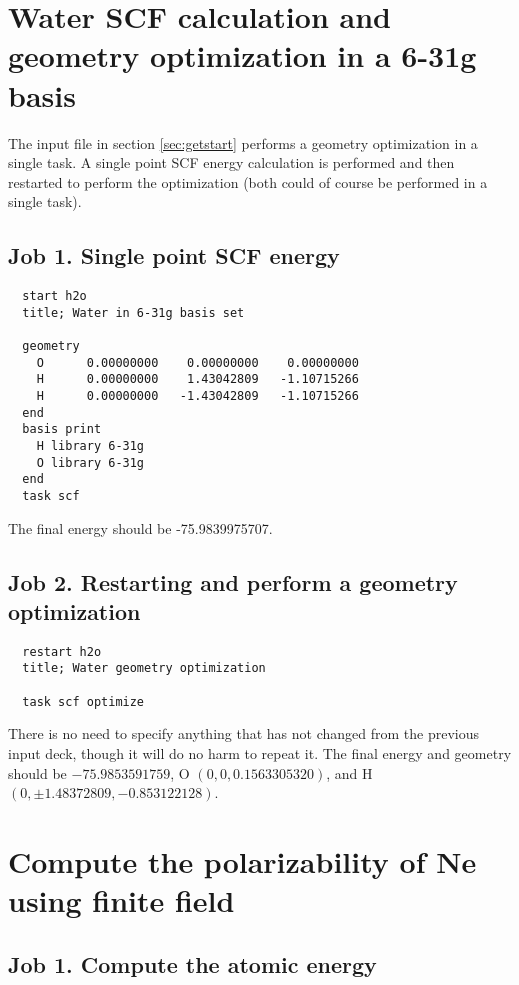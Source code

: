 \label{sec:sample}
\section{Water SCF calculation and geometry optimization in a 6-31g basis}
\label{sec:sample1}

The input file in section \ref{sec:getstart} performs a geometry optimization
in a single task. A single point SCF energy calculation is performed and then
restarted to perform the optimization (both could of course be
performed in a single task).

\subsection{Job 1.  Single point SCF energy}

\begin{verbatim}
  start h2o
  title; Water in 6-31g basis set

  geometry
    O      0.00000000    0.00000000    0.00000000
    H      0.00000000    1.43042809   -1.10715266
    H      0.00000000   -1.43042809   -1.10715266
  end
  basis print
    H library 6-31g
    O library 6-31g
  end
  task scf
\end{verbatim}

The final energy should be -75.9839975707.

\subsection{Job 2. Restarting and perform a geometry optimization}

\begin{verbatim}
  restart h2o
  title; Water geometry optimization

  task scf optimize
\end{verbatim}

There is no need to specify anything that has not changed from the
previous input deck, though it will do no harm to repeat it.  The
final energy and geometry should be $-75.9853591759$, O
$(0,0,0.1563305320)$, and H $(0, \pm1.48372809, -0.853122128)$.

\section{Compute the polarizability of Ne using finite field}
\label{sec:sample2}

\subsection{Job 1. Compute the atomic energy}

